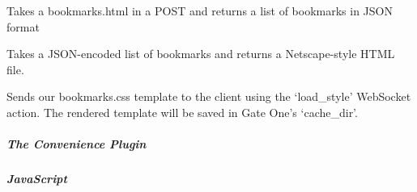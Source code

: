 \documentclass[letterpaper,10pt,openany]{sphinxmanual}
\begin{document}

\begin{fulllineitems}
\label{Applications/terminal/plugin_bookmarks:bookmarks.ImportHandler}
Takes a bookmarks.html in a POST and returns a list of bookmarks in JSON
format

\end{fulllineitems}


\begin{fulllineitems}
\label{Applications/terminal/plugin_bookmarks:bookmarks.ExportHandler}
Takes a JSON-encoded list of bookmarks and returns a Netscape-style HTML
file.

\end{fulllineitems}


\begin{fulllineitems}
\label{Applications/terminal/plugin_bookmarks:bookmarks.send_bookmarks_css_template}
Sends our bookmarks.css template to the client using the `load\_style'
WebSocket action.  The rendered template will be saved in Gate One's
`cache\_dir'.

\end{fulllineitems}



\subparagraph{The Convenience Plugin}
\label{Applications/terminal/plugin_convenience::doc}\label{Applications/terminal/plugin_convenience:convenience-plugin}\label{Applications/terminal/plugin_convenience:the-convenience-plugin}

\subparagraph{JavaScript}
\label{Applications/terminal/plugin_convenience:javascript}
\end{document}
